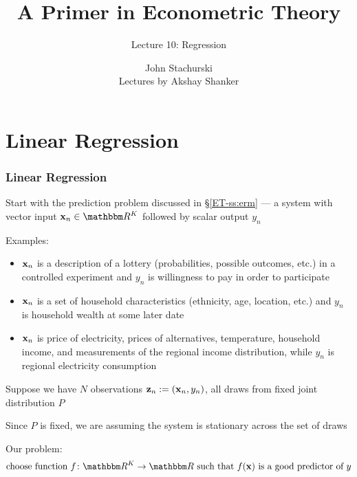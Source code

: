 





\title{A Primer in Econometric Theory}

\subtitle
{Lecture 10:  Regression}

\author{John Stachurski \\ \tiny Lectures by Akshay Shanker}





\begin{frame}
  \titlepage
\end{frame}

\section{Linear Regression}


\begin{frame}\frametitle{Linear Regression}
    
    \vspace{2em}
    Start with the prediction problem discussed in \S\ref{ET-ss:erm} --- a system with vector input $\boldx_n \in \RR^K$ followed by scalar
    output $y_n$
    
    \vspace{.7em}
    Examples:
    
    \begin{itemize}
        \item ${\mathbf x}_n$ is a description of a lottery (probabilities,
            possible outcomes, etc.) 
            in a controlled experiment and $y_n$ is willingness to pay in order to
            participate 
        \item ${\mathbf x}_n$ is a set of household characteristics (ethnicity,
        age, location, etc.) and $y_n$ is household wealth at some later
            date 
        \item ${\mathbf x}_n$ is price of electricity, prices of alternatives,
            temperature, household income, and measurements of the regional income
            distribution, while $y_n$ is regional electricity consumption 
    \end{itemize}
    
\end{frame}

\begin{frame}

    \vspace{2em}
    Suppose we have $N$ observations ${\mathbf z}_n := ({\mathbf x}_n,y_n)$, 
    all draws from fixed joint distribution $P$
    
    Since $P$ is fixed, we are assuming the system is stationary across the set of draws
     
    \vspace{.7em}     
    Our problem:
    \small\begin{equation*}\label{eq:prp}
        \text{choose function } f \colon \RR^K \to \RR \text{ such that }
        f(\boldx) \text{ is a good predictor of } y
    \end{equation*}
 
\end{frame}

